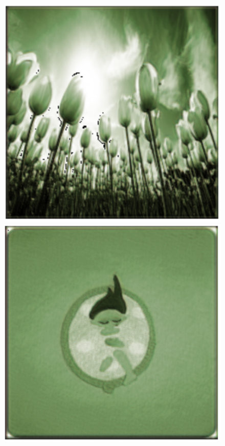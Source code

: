 \documentclass[]{article}
\begin{document}
	\begin{figure}[H]
		\includegraphics[scale=0.35]{m3_1.png}
		\includegraphics[scale=0.35]{m3_2.png}

\end{figure}
\end{document}
